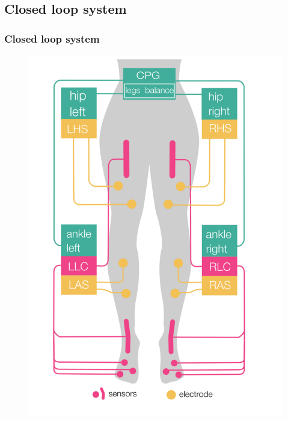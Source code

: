 \documentclass[12pt, aspectratio=169]{beamer}
\begin{document}
\subsection{Closed loop system}
\begin{frame}
  \frametitle{Closed loop system}
  \begin{figure}
    \includegraphics[width=0.4\linewidth]{NNP}
  \end{figure}
\end{frame}
\end{document}
